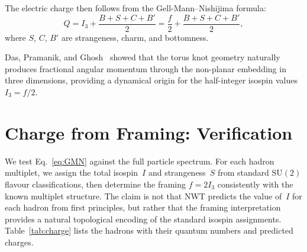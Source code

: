 \documentclass[11pt,a4paper]{article}
\begin{document}
The electric charge then follows from the Gell-Mann--Nishijima
formula:
\begin{equation}
  Q = I_3 + \frac{B + S + C + B'}{2}
    = \frac{f}{2} + \frac{B + S + C + B'}{2},
  \label{eq:GMN}
\end{equation}
where $S$, $C$, $B'$ are strangeness, charm, and bottomness.

Das, Pramanik, and Ghosh~\cite{Das2016} showed that the
torus knot geometry naturally produces fractional angular
momentum through the non-planar embedding in three dimensions,
providing a dynamical origin for the half-integer isospin
values $I_3 = f/2$.


\section{Charge from Framing: Verification}
\label{sec:charge}

We test Eq.~\eqref{eq:GMN} against the full particle spectrum.
For each hadron multiplet, we assign the total isospin~$I$ and
strangeness~$S$ from standard $\mathrm{SU}(2)$ flavour
classifications, then determine the framing
$f = 2I_3$ consistently with the known multiplet structure.
The claim is not that NWT predicts the value of~$I$ for each
hadron from first principles, but rather that the framing
interpretation provides a natural topological encoding of the
standard isospin assignments.
Table~\ref{tab:charge} lists the hadrons with their quantum
numbers and predicted charges.
\end{document}
